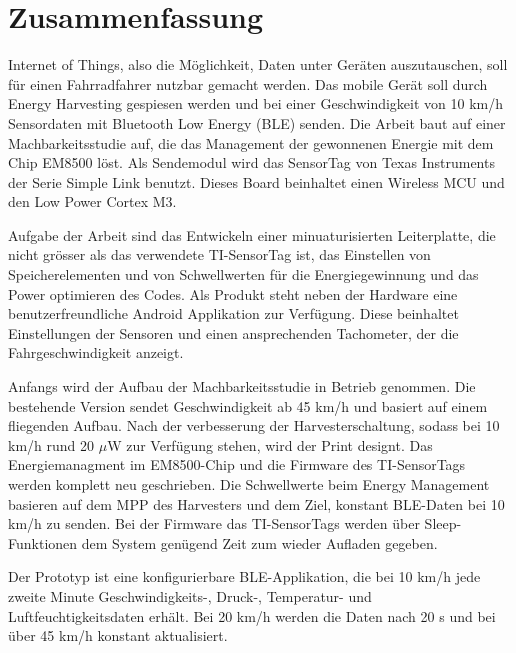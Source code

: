 \chapter*{Zusammenfassung}

Internet of Things, also die Möglichkeit, Daten unter Geräten auszutauschen, soll für einen Fahrradfahrer nutzbar gemacht werden. Das  mobile Gerät soll durch Energy Harvesting gespiesen werden und bei einer Geschwindigkeit von 10 km/h Sensordaten mit Bluetooth Low Energy (BLE) senden. Die Arbeit baut auf einer Machbarkeitsstudie auf, die das Management der gewonnenen Energie mit dem Chip EM8500 löst. Als Sendemodul wird das SensorTag von Texas Instruments der Serie Simple Link benutzt. Dieses Board beinhaltet einen Wireless MCU und den Low Power Cortex M3. 

Aufgabe der Arbeit sind das Entwickeln einer minuaturisierten Leiterplatte, die nicht grösser als das verwendete TI-SensorTag ist, das Einstellen von Speicherelementen und von Schwellwerten für die Energiegewinnung und das Power optimieren des Codes. Als Produkt steht neben der Hardware eine benutzerfreundliche Android Applikation zur Verfügung. Diese beinhaltet Einstellungen der Sensoren und einen ansprechenden Tachometer, der die Fahrgeschwindigkeit anzeigt. 

Anfangs wird der Aufbau der Machbarkeitsstudie in Betrieb genommen. Die bestehende Version sendet Geschwindigkeit ab 45 km/h und basiert auf einem fliegenden Aufbau.
Nach der verbesserung der Harvesterschaltung, sodass bei 10 km/h rund 20 $\mu$W zur Verfügung stehen, wird der Print designt. Das Energiemanagment im EM8500-Chip und die Firmware des TI-SensorTags werden komplett neu geschrieben. Die Schwellwerte beim Energy Management basieren auf dem MPP des Harvesters und dem Ziel, konstant BLE-Daten bei 10 km/h zu senden. Bei der Firmware das TI-SensorTags werden über Sleep-Funktionen dem System genügend Zeit zum wieder Aufladen gegeben. 

Der Prototyp ist eine konfigurierbare BLE-Applikation, die bei 10 km/h jede zweite Minute Geschwindigkeits-, Druck-, Temperatur- und Luftfeuchtigkeitsdaten erhält. Bei 20 km/h werden die Daten nach 20 s und bei über 45 km/h konstant aktualisiert.
